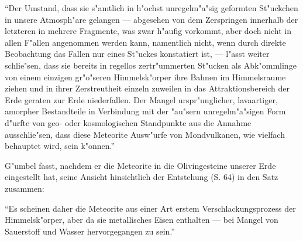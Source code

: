 \documentclass[a4paper, 11pt, oneside]{article}
\begin{document}
"`Der Umstand, dass sie s"amtlich in h"ochst unregelm"a"sig geformten St"uckchen in unsere Atmosph"are gelangen --- abgesehen von dem Zerspringen innerhalb der letzteren in mehrere Fragmente, was zwar h"aufig vorkommt, aber doch nicht in allen F"allen angenommen werden kann, namentlich nicht, wenn durch direkte Beobachtung das Fallen nur eines St"uckes konstatiert ist, --- l"asst weiter schlie"sen, dass sie bereits in regellos zertr"ummerten St"ucken als Abk"ommlinge von einem einzigen gr"o"seren Himmelsk"orper ihre Bahnen im Himmelsraume ziehen und in ihrer Zerstreutheit einzeln zuweilen in das Attraktionsbereich der Erde geraten zur Erde niederfallen. Der Mangel urspr"unglicher, lavaartiger, amorpher Bestandteile in Verbindung mit der "au"sern unregelm"a"sigen Form d"urfte von geo- oder kosmologischen Standpunkte aus die Annahme ausschlie"sen, dass diese Meteorite Ausw"urfe von Mondvulkanen, wie vielfach behauptet wird, sein k"onnen."'

G"umbel fasst, nachdem er die Meteorite in die Olivingesteine unserer Erde eingestellt hat, seine Ansicht hinsichtlich der Entstehung (S. 64) in den Satz zusammen:

"`Es scheinen daher die Meteorite aus einer Art erstem Verschlackungsprozess der Himmelsk"orper, aber da sie metallisches Eisen enthalten --- bei Mangel von Sauerstoff und Wasser hervorgegangen zu sein."'
\end{document}
